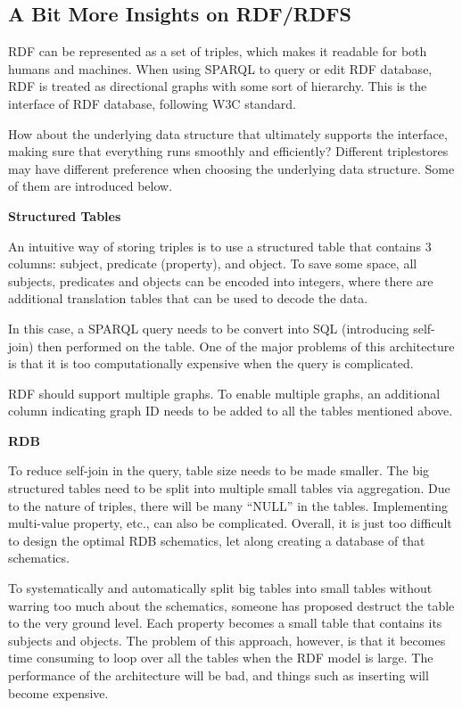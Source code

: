 \subsection{A Bit More Insights on RDF/RDFS}

RDF can be represented as a set of triples, which makes it readable for both humans and machines. When using SPARQL to query or edit RDF database, RDF is treated as directional graphs with some sort of hierarchy. This is the interface of RDF database, following W3C standard.

How about the underlying data structure that ultimately supports the interface, making sure that everything runs smoothly and efficiently? Different triplestores may have different preference when choosing the underlying data structure. Some of them are introduced below.

\vspace{0.1in}
\noindent \textbf{Structured Tables}
\vspace{0.1in}

An intuitive way of storing triples is to use a structured table that contains 3 columns: subject, predicate (property), and object. To save some space, all subjects, predicates and objects can be encoded into integers, where there are additional translation tables that can be used to decode the data.

In this case, a SPARQL query needs to be convert into SQL (introducing self-join) then performed on the table. One of the major problems of this architecture is that it is too computationally expensive when the query is complicated.

RDF should support multiple graphs. To enable multiple graphs, an additional column indicating graph ID needs to be added to all the tables mentioned above.

\vspace{0.1in}
\noindent \textbf{RDB}
\vspace{0.1in}

To reduce self-join in the query, table size needs to be made smaller. The big structured tables need to be split into multiple small tables via aggregation. Due to the nature of triples, there will be many ``NULL'' in the tables. Implementing multi-value property, etc., can also be complicated. Overall, it is just too difficult to design the optimal RDB schematics, let along creating a database of that schematics.

To systematically and automatically split big tables into small tables without warring too much about the schematics, someone has proposed destruct the table to the very ground level. Each property becomes a small table that contains its subjects and objects. The problem of this approach, however, is that it becomes time consuming to loop over all the tables when the RDF model is large. The performance of the architecture will be bad, and things such as inserting will become expensive.

